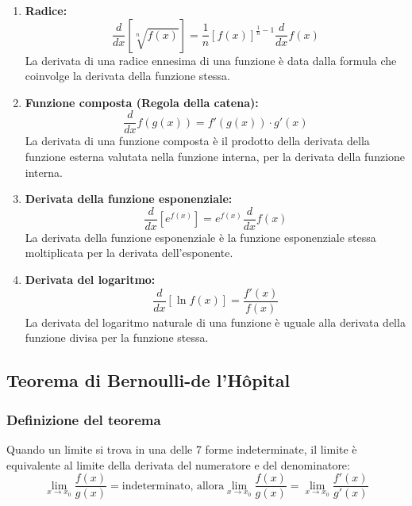 \documentclass{article}
\begin{document}
\begin{enumerate}
    \item \textbf{Radice:}
    \begin{equation*}
        \frac{d}{dx} \left[ \sqrt[n]{f(x)} \right] = \frac{1}{n} \left[ f(x) \right]^{\frac{1}{n} - 1} \frac{d}{dx} f(x)
    \end{equation*}
    La derivata di una radice ennesima di una funzione è data dalla formula che coinvolge la derivata della funzione stessa.
    
    \item \textbf{Funzione composta (Regola della catena):}
    \begin{equation*}
        \frac{d}{dx} f(g(x)) = f'(g(x)) \cdot g'(x)
    \end{equation*}
    La derivata di una funzione composta è il prodotto della derivata della funzione esterna valutata nella funzione interna, per la derivata della funzione interna.
        
    \item \textbf{Derivata della funzione esponenziale:}
    \begin{equation*}
        \frac{d}{dx} [e^{f(x)}] = e^{f(x)} \frac{d}{dx} f(x)
    \end{equation*}
    La derivata della funzione esponenziale è la funzione esponenziale stessa moltiplicata per la derivata dell'esponente.
    
    \item \textbf{Derivata del logaritmo:}
    \begin{equation*}
        \frac{d}{dx} [\ln f(x)] = \frac{f'(x)}{f(x)}
    \end{equation*}
    La derivata del logaritmo naturale di una funzione è uguale alla derivata della funzione divisa per la funzione stessa.
\end{enumerate}

\newpage
\subsection{Teorema di Bernoulli-de l'Hôpital}
\subsubsection{Definizione del teorema}
Quando un limite si trova in una delle 7 forme indeterminate, il limite è equivalente al
limite della derivata del numeratore e del denominatore:
\begin{equation*}
    \lim_{x \to x_0} \frac{f(x)}{g(x)} = \text{indeterminato, allora}
    \lim_{x \to x_0} \frac{f(x)}{g(x)}=\lim_{x \to x_0} \frac{f'(x)}{g'(x)} 
\end{equation*}
\end{document}
